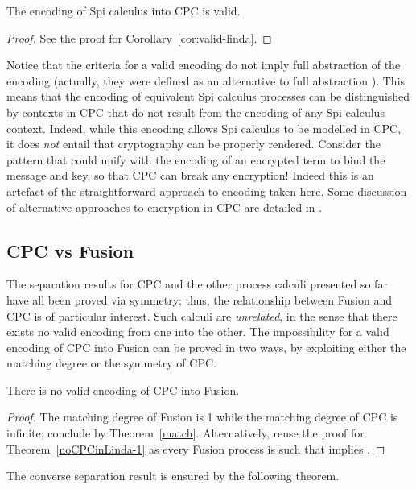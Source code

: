 \documentclass{LMCS}
\begin{document}
\begin{cor}
\label{cor:valid-spi}
The encoding of Spi calculus into CPC is valid.
\end{cor}
\begin{proof}
See the proof for Corollary~\ref{cor:valid-linda}. 
\end{proof}

Notice that the criteria for a valid encoding do not imply full
abstraction of the encoding (actually, they were defined as an alternative to full abstraction
\cite{G:IC08,G:CONCUR08}). This means that the encoding of equivalent
Spi calculus processes can be distinguished by contexts in CPC that do not result from the
encoding of any Spi calculus context. Indeed, while this encoding allows Spi calculus to be modelled in
CPC, it does {\em not} entail that cryptography can be properly rendered.
Consider the pattern  that could unify with the encoding of an encrypted term
to bind the message and key, so that CPC can break any encryption!
Indeed this is an artefact of the straightforward approach to encoding taken here.
Some discussion of alternative approaches to encryption in CPC are detailed in 
\cite{GivenWilsonPHD}.


\subsection{CPC vs Fusion}

The separation results for CPC and the other process calculi presented so far have all been proved via symmetry;
thus, the relationship between Fusion and CPC is of particular interest.
Such calculi are {\em unrelated}, in the sense that there exists no valid
encoding from one into the other. The impossibility for a valid
encoding of CPC into Fusion can be proved in two ways, by exploiting either the matching degree or the symmetry of CPC.

\begin{thm}
\label{thm:nocpc2fusion-1}
There is no valid encoding of CPC into Fusion.
\end{thm}
\begin{proof}
The matching degree of Fusion is 1 while the matching degree of CPC is infinite;
conclude by Theorem~\ref{match}.
Alternatively, reuse the proof for Theorem~\ref{noCPCinLinda-1} as every Fusion process 
 is such that  implies .
\end{proof}

The converse separation result is ensured by the following theorem.
\end{document}
